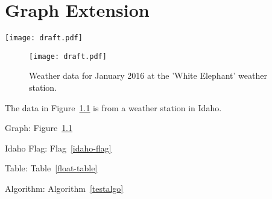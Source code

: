 
\chapter{\label{graph-extension}Graph Extension}
\par
\texttt{[image: draft.pdf]}
\begin{figure}

\par
\texttt{[image: draft.pdf]}\caption{\label{white-elephant}Weather data for January 2016 at the 'White Elephant' weather station.}
\end{figure}

\par The data in Figure~\ref{white-elephant} is from a weather station in Idaho.
\par Graph: Figure~\ref{white-elephant}
\par Idaho Flag: Flag~\ref{idaho-flag}
\par Table: Table~\ref{float-table}
\par Algorithm: Algorithm~\ref{testalgo}
